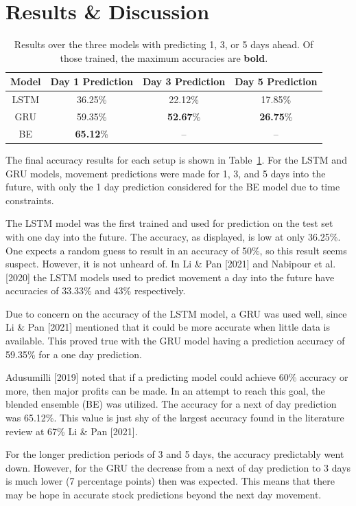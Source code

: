 \documentclass{article}
\begin{document}
\section{Results \& Discussion}

\begin{table}
	\centering
	\caption{Results over the three models with predicting 1, 3, or 5 days
	ahead. Of those trained, the maximum accuracies are \textbf{bold}.}
	\begin{tabular}{c c c c}
		\toprule
		Model & Day 1 Prediction & Day 3 Prediction & Day 5 Prediction\\
		\midrule
		LSTM & 36.25\% & 22.12\% & 17.85\%\\
		GRU & 59.35\% & \textbf{52.67}\% & \textbf{26.75}\%\\
		BE & \textbf{65.12}\% & -- & -- \\
		\bottomrule
	\end{tabular}
	\label{tbl:results}
\end{table}

The final accuracy results for each setup is shown in Table~\ref{tbl:results}.
For the LSTM and GRU models, movement predictions were made for 1, 3, and 5 days
into the future, with only the 1 day prediction considered for the BE model due
to time constraints.

The LSTM model was the first trained and used for prediction on the test set
with one day into the future.  The accuracy, as displayed, is low at only
36.25\%. One expects a random guess to result in an accuracy of 50\%,
so this result seems suspect. However, it is not unheard of.
In Li \& Pan [2021] and Nabipour et al. [2020] the LSTM models used to predict movement a day into the future
have accuracies of 33.33\% and 43\% respectively.

Due to concern on the accuracy of the LSTM model, a GRU was used well, since
Li \& Pan [2021] mentioned that it could be more accurate when little data is available. This
proved true with the GRU model having a prediction accuracy of 59.35\% for a one
 day prediction.

Adusumilli [2019] noted that if a predicting model could achieve 60\% accuracy or more, then
major profits can be made. In an attempt to reach this goal, the blended
ensemble (BE) was utilized. The accuracy for a next of day prediction was
65.12\%. This value is just shy of the largest accuracy found in the
literature review at 67\% Li \& Pan [2021].

For the longer prediction periods of 3 and 5 days, the accuracy predictably went
down. However, for the GRU the decrease from a next of day prediction to 3 days
is much lower (7 percentage points) then was expected. This means that there may
be hope in accurate stock predictions beyond the next day movement.
\end{document}
